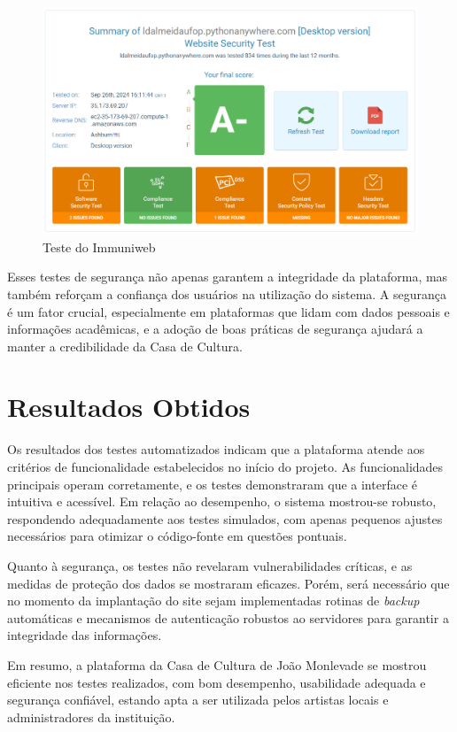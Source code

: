 \begin{figure}[htb] \caption{\label{fig_immuniweb}Teste do Immuniweb} \begin{center} \includegraphics[scale=0.5]{./img/immuniweb.png} \end{center}  \end{figure}

Esses testes de segurança não apenas garantem a integridade da plataforma, mas também reforçam a confiança dos usuários na utilização do sistema. A segurança é um fator crucial, especialmente em plataformas que lidam com dados pessoais e informações acadêmicas, e a adoção de boas práticas de segurança ajudará a manter a credibilidade da Casa de Cultura.

\section{Resultados Obtidos}


Os resultados dos testes automatizados indicam que a plataforma atende aos critérios de funcionalidade estabelecidos no início do projeto. As funcionalidades principais operam corretamente, e os testes demonstraram que a interface é intuitiva e acessível. Em relação ao desempenho, o sistema mostrou-se robusto, respondendo adequadamente aos testes simulados, com apenas pequenos ajustes necessários para otimizar o código-fonte em questões pontuais.

Quanto à segurança, os testes não revelaram vulnerabilidades críticas, e as medidas de proteção dos dados se mostraram eficazes. Porém, será necessário que no momento da implantação do site sejam implementadas rotinas de \textit{backup} automáticas e mecanismos de autenticação robustos ao servidores para garantir a integridade das informações.

Em resumo, a plataforma da Casa de Cultura de João Monlevade se mostrou eficiente nos testes realizados, com bom desempenho, usabilidade adequada e segurança confiável, estando apta a ser utilizada pelos artistas locais e administradores da instituição.